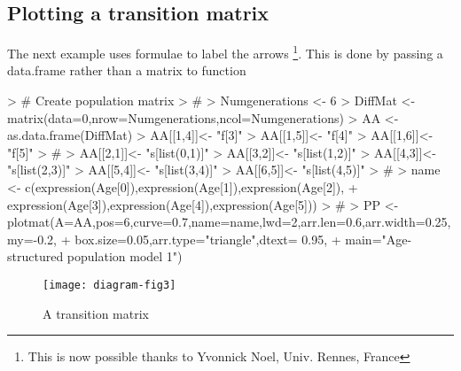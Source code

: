 \documentclass[article,nojss]{jss}
\begin{document}
\subsection{Plotting a transition matrix}
The next example uses formulae to label the arrows \footnote{This is now possible thanks to Yvonnick Noel, Univ. Rennes, France}. This is done by passing
a data.frame rather than a matrix to function 
\begin{Schunk}
\begin{Sinput}
> # Create population matrix
> #
> Numgenerations   <- 6
> DiffMat  <- matrix(data=0,nrow=Numgenerations,ncol=Numgenerations)
> AA <- as.data.frame(DiffMat)
> AA[[1,4]]<- "f[3]"
> AA[[1,5]]<- "f[4]"
> AA[[1,6]]<- "f[5]"
> #
> AA[[2,1]]<- "s[list(0,1)]"
> AA[[3,2]]<- "s[list(1,2)]"
> AA[[4,3]]<- "s[list(2,3)]"
> AA[[5,4]]<- "s[list(3,4)]"
> AA[[6,5]]<- "s[list(4,5)]"
> #
> name  <- c(expression(Age[0]),expression(Age[1]),expression(Age[2]),
+            expression(Age[3]),expression(Age[4]),expression(Age[5]))
> #
> PP <- plotmat(A=AA,pos=6,curve=0.7,name=name,lwd=2,arr.len=0.6,arr.width=0.25,my=-0.2,
+               box.size=0.05,arr.type="triangle",dtext= 0.95,
+               main="Age-structured population model 1")
\end{Sinput}
\end{Schunk}
\begin{figure}
\begin{center}
\texttt{[image: diagram-fig3]}
\end{center}
\caption{A transition matrix}
\label{fig:three}
\end{figure}
\end{document}
